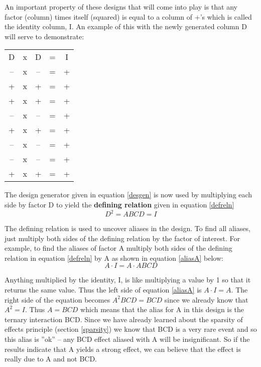 An important property of these designs that will come into play is that any factor (column) times itself (squared) is equal to a column of +'s which is called the identity column, I. An example of this with the newly generated column D will serve to demonstrate:

\begin{center}
\begin{tabular}{ccccc}
 D  & x & D  & =  & I \\ 
 -- & x & -- & =  & + \\ 
 +  & x & +  & =  & + \\ 
 +  & x & +  & =  & + \\ 
 -- & x & -- & =  & + \\
 +  & x & +  & =  & + \\
 -- & x & -- & =  & + \\
 -- & x & -- & =  & + \\
 +  & x & +  & =  & + \\ 
 
\end{tabular} 
\end{center}


The design generator given in equation \ref{desgen}  is now used by multiplying each side by factor D to yield the \textbf{defining relation} given in equation \ref{defreln}
\begin{equation}\label{defreln}
D^{2} = ABCD = I
\end{equation}

The defining relation is used  to uncover aliases in the design. To find all aliases, just multiply both sides of the defining relation by the factor of interest. For example, to find the aliases of factor A multiply both sides of the defining relation in equation \ref{defreln} by A as shown in equation \ref{aliasA} below:
\begin{equation}\label{aliasA}
A \cdot I = A \cdot ABCD
\end{equation}

Anything multiplied by the identity, I, is like multiplying a value by 1 so that it returns the same value.  Thus the left side of equation \ref{aliasA} is  $A \cdot I = A$.  The right side of the equation becomes $A^{2}BCD = BCD$ since we already know that $A^{2} = I$.  Thus $A = BCD$ which means that the alias for A in this design is the ternary interaction BCD.  Since we have already learned about the sparsity of effects principle (section \ref{sparsity}) we know that BCD is a very rare event and so this alias is ''ok'' -- any BCD effect aliased with A will be insignificant.  So if the results indicate that A yields a strong effect, we can believe that the effect is really due to A and not BCD.

